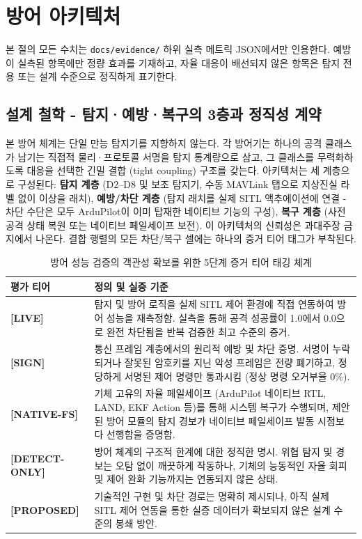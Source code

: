 \section{방어 아키텍처}

본 절의 모든 수치는 \texttt{docs/evidence/} 하위 실측 메트릭 JSON에서만 인용한다. 예방이 실측된 항목에만 정량 효과를 기재하고, 자율 대응이 배선되지 않은 항목은 탐지 전용 또는 설계 수준으로 정직하게 표기한다.

\subsection{설계 철학 - 탐지·예방·복구의 3층과 정직성 계약}

본 방어 체계는 단일 만능 탐지기를 지향하지 않는다. 각 방어기는 하나의 공격 클래스가 남기는 직접적 물리·프로토콜 서명을 탐지 통계량으로 삼고, 그 클래스를 무력화하도록 대응을 선택한 긴밀 결합 (tight coupling) 구조를 갖는다. 아키텍처는 세 계층으로 구성된다: \textbf{탐지 계층} (D2--D8 및 보조 탐지기, 수동 MAVLink 탭으로 지상진실 라벨 없이 이상을 래치), \textbf{예방/차단 계층} (탐지 래치를 실제 SITL 액추에이션에 연결 - 차단 수단은 모두 ArduPilot이 이미 탑재한 네이티브 기능의 구성), \textbf{복구 계층} (사전 공격 상태 복원 또는 네이티브 페일세이프 보전).
이 아키텍처의 신뢰성은 과대주장 금지에서 나온다. 결합 행렬의 모든 차단/복구 셀에는 하나의 증거 티어 태그가 부착된다.

\begin{table}[t!]
\centering
\caption{방어 성능 검증의 객관성 확보를 위한 5단계 증거 티어 태깅 체계}
\label{tab:tier_tags}
\renewcommand{\arraystretch}{1.3}
\small
\begin{tabularx}{\textwidth}{@{} l >{\raggedright\arraybackslash}X @{}}
\toprule
\textbf{평가 티어} & \textbf{정의 및 실증 기준} \\
\midrule
\textbf{[LIVE]} & 탐지 및 방어 로직을 실제 SITL 제어 환경에 직접 연동하여 방어 성능을 재측정함. 실측을 통해 공격 성공률이 1.0에서 0.0으로 완전 차단됨을 반복 검증한 최고 수준의 증거. \\
\textbf{[SIGN]} & 통신 프레임 계층에서의 원리적 예방 및 차단 증명. 서명이 누락되거나 잘못된 암호키를 지닌 악성 프레임은 전량 폐기하고, 정당하게 서명된 제어 명령만 통과시킴 (정상 명령 오거부율 0\%). \\
\textbf{[NATIVE-FS]} & 기체 고유의 자율 페일세이프 (ArduPilot 네이티브 RTL, LAND, EKF Action 등)를 통해 시스템 복구가 수행되며, 제안된 방어 모듈의 탐지 경보가 네이티브 페일세이프 발동 시점보다 선행함을 증명함. \\
\textbf{[DETECT-ONLY]} & 방어 체계의 구조적 한계에 대한 정직한 명시. 위협 탐지 및 경보는 오탐 없이 깨끗하게 작동하나, 기체의 능동적인 자율 회피 및 제어 완화 기능까지는 연동되지 않은 상태. \\
\textbf{[PROPOSED]} & 기술적인 구현 및 차단 경로는 명확히 제시되나, 아직 실제 SITL 제어 연동을 통한 실증 데이터가 확보되지 않은 설계 수준의 봉쇄 방안. \\
\bottomrule
\end{tabularx}
\end{table}

